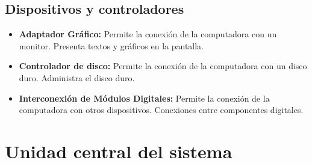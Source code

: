 \documentclass{templateNote}
\begin{document}
\subsection{Dispositivos y controladores}
\begin{itemize}
    \item \textbf{Adaptador Gráfico:} Permite la conexión de la computadora con un monitor. Presenta textos y gráficos en la pantalla.
    \item \textbf{Controlador de disco:} Permite la conexión de la computadora con un disco duro. Administra el disco duro.
    \item \textbf{Interconexión de Módulos Digitales:} Permite la conexión de la computadora con otros dispositivos. Conexiones entre componentes digitales.
\end{itemize}
\newpage

\section{Unidad central del sistema}
\end{document}
